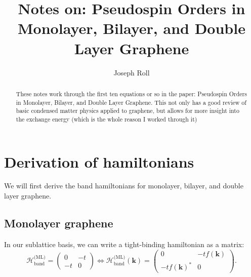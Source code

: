 \documentclass[12pt]{revtex4-2}
\begin{document}
\title{Notes on: Pseudospin Orders in Monolayer, Bilayer, and Double Layer Graphene}
\author{Joseph Roll}

\begin{abstract}
    These notes work through the first ten equations or so in the paper: Pseudospin Orders in Monolayer, Bilayer, and Double Layer Graphene.  This not only has a good review of basic condensed matter physics applied to graphene, but allows for more insight into the exchange energy (which is the whole reason I worked through it)
\end{abstract}

\maketitle

\section{Derivation of hamiltonians}
We will first derive the band hamiltonians for monolayer, bilayer, and double layer graphene.

\subsection{Monolayer graphene}
In our sublattice basis, we can write a tight-binding hamiltonian as a matrix:
\begin{equation}
    \mathcal{H}_\text{band}^\text{(ML)} = \begin{pmatrix}
        0 & -t \\
        -t & 0
    \end{pmatrix} \iff \mathcal{H}_\text{band}^\text{(ML)}(\mathbf{k}) = \begin{pmatrix}
        0 & -t f(\mathbf{k}) \\
        -t f(\mathbf{k})^* & 0 
    \end{pmatrix}.
\end{equation}
\end{document}
